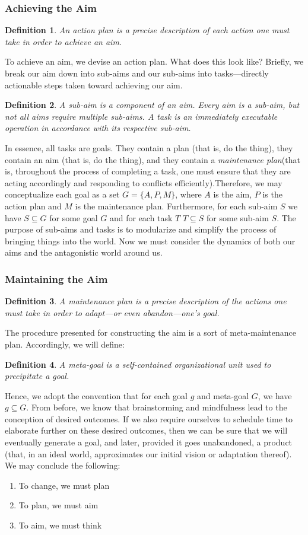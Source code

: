 \documentclass{book}
\newtheorem{defn}{Definition}[section]
\numberwithin{equation}{section}
\begin{document}
\subsubsection{Achieving the Aim}
\begin{defn}
An action plan is a precise description of each action one must take in order to achieve an aim.
\end{defn}

To achieve an aim, we devise an action plan. What does this look like? Briefly, we break our aim down into sub-aims and our sub-aims into tasks---directly actionable steps taken toward achieving our aim.
\begin{defn}
A sub-aim is a component of an aim. Every aim is a sub-aim, but not all aims require multiple sub-aims. A task is an immediately executable operation in accordance with its respective sub-aim.
\end{defn}
In essence, all tasks are goals. They contain a plan (that is, do the thing), they contain an aim (that is, do the thing), and they contain a \emph{maintenance plan}(that is, throughout the process of completing a task, one must ensure that they are acting accordingly and responding to conflicts efficiently).Therefore, we may conceptualize each goal as a set $G=\{A, P, M\}$, where $A$ is the aim, $P$ is the action plan and $M$ is the maintenance plan. Furthermore,  for each sub-aim $S$ we have $S \subseteq G$ for some goal $G$ and for each task $T$ $T\subseteq S$ for some sub-aim $S$. The purpose of sub-aims and tasks is to modularize and simplify the process of bringing things into the world. Now we must consider the dynamics of both our aims and the antagonistic world around us.
\subsubsection{Maintaining the Aim}
\begin{defn}
A maintenance plan is a precise description of the actions one must take in order to adapt---or even abandon---one's goal.
\end{defn}

The procedure presented for constructing the aim is a sort of meta-maintenance plan. Accordingly, we will define: 
\begin{defn}
A meta-goal is a self-contained organizational unit used to precipitate a goal.
\end{defn}
Hence, we adopt the convention that for each goal $g$ and meta-goal $G$, we have $g\subseteq G$. From before, we know that brainstorming and mindfulness lead to the conception of desired outcomes. If we also require ourselves to schedule time to elaborate further on these desired outcomes, then we can be sure that we will eventually generate a goal, and later, provided it goes unabandoned, a product (that, in an ideal world, approximates our initial vision or adaptation thereof). We may conclude the following:
\begin{enumerate}
    \item To change, we must plan
    \item To plan, we must aim
    \item To aim, we must think
\end{enumerate}
\end{document}
